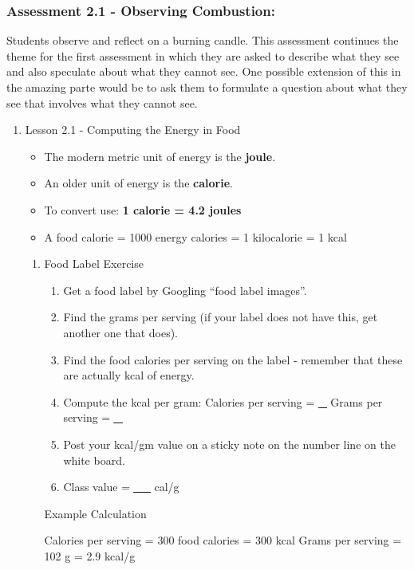 \documentclass[11pt]{article}
\begin{document}
\subsubsection{Assessment 2.1 - Observing Combustion:}
\label{sec:orge973772}

Students observe and reflect on a burning candle. This assessment continues the theme for the first assessment in which they are asked to
describe what they see and also speculate about what they cannot see. One possible extension
of this in the amazing parte would be to ask them to formulate a question about what they see
that involves what they cannot see.

\begin{enumerate}
\item Lesson 2.1 - Computing the Energy in Food
\label{sec:org5061a35}

\begin{itemize}
\item The modern metric unit of energy is the \textbf{\textbf{joule}}.
\item An older unit of energy is the \textbf{\textbf{calorie}}.
\item To convert use: \textbf{\textbf{1 calorie = 4.2 joules}}
\item A food calorie = 1000 energy calories = 1 kilocalorie = 1 kcal
\end{itemize}

\begin{enumerate}
\item Food Label Exercise
\label{sec:orgfc24292}

\begin{enumerate}
\item Get a food label by Googling “food label images”.
\item Find the grams per serving (if your label does not have this, get another one that does).
\item Find the food calories per serving on the label - remember that these are actually kcal of energy.
\item Compute the kcal per gram:
Calories per serving = \uline{\uline{\uline{\uline{\uline{\uline{\uline{\uline{\uline{\uline{\uline{\uline{\uline{\uline{\uline{\uline{\_}}}}}}}}}}}}}}}}
Grams per serving = \uline{\uline{\uline{\uline{\uline{\uline{\uline{\uline{\uline{\uline{\uline{\uline{\uline{\uline{\uline{\uline{\uline{\_}}}}}}}}}}}}}}}}}

\item Post your kcal/gm value on a sticky note on the number line on the white board.
\item Class value = \uline{\uline{\uline{\uline{\uline{\uline{\uline{\uline{\uline{\uline{\uline{\_\_}}}}}}}}}}} cal/g
\end{enumerate}

Example Calculation

Calories per serving = 300 food calories = 300 kcal
Grams per serving = 102 g = 2.9 kcal/g
\end{enumerate}
\end{enumerate}
\end{document}
